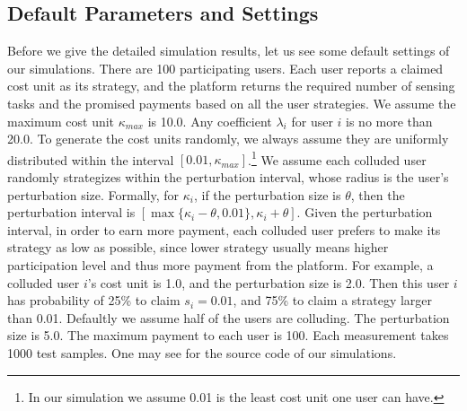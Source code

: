 \documentclass[conference]{IEEEtran}
\theoremstyle{definition}
\begin{document}
\subsection{Default Parameters and Settings}
Before we give the detailed simulation results, let us see some default settings of our simulations. There are 100 participating users. Each user reports a claimed cost unit as its strategy, and the platform returns the required number of sensing tasks and the promised payments based on all the user strategies. We assume the maximum cost unit $\kappa_{max}$ is 10.0. %
Any coefficient $\lambda_i$ for user $i$ is no more than 20.0. To generate the cost units randomly, we always assume they are uniformly distributed within the interval $[0.01,\kappa_{max}]$.\footnote{In our simulation we assume 0.01 is the least cost unit one user can have.} We assume each colluded user randomly strategizes within the perturbation interval, whose radius is the user's perturbation size. Formally, for $\kappa_i$, if the perturbation size is $\theta$, then the perturbation interval is $[\max\{\kappa_i-\theta,0.01\},\kappa_i+\theta]$. Given the perturbation interval, in order to earn more payment, each colluded user prefers to make its strategy as low as possible, since lower strategy usually means higher participation level and thus more payment from the platform. For example, a colluded user $i$'s cost unit is 1.0, and the perturbation size is 2.0. Then this user $i$ has probability of 25\% to claim $s_i=0.01$, and 75\% to claim a strategy larger than 0.01. Defaultly we assume half of the users are colluding. The perturbation size is 5.0. The maximum payment to each user is 100. Each measurement takes 1000 test samples. One may see \cite{mycodes} for the source code of our simulations.
\end{document}
